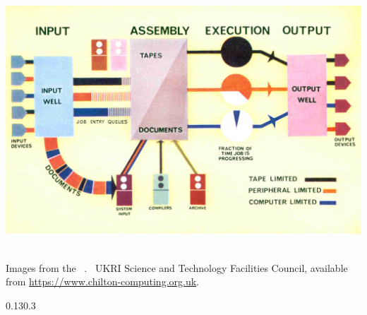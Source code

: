 \documentclass[aspectratio=169,mathserif,notheorems]{beamer}%
\begin{document}
\begin{frame}[t]
{{{{{\includegraphics[width=\linewidth,trim={0 10px 0 10px},clip]{graphics/atlas2}%
}%
}\strut\\[3pt]%
\tiny{Images from the ~\cite{M2025CC:FCSA1B1}. %
\textcopyright~UKRI Science and Technology Facilities Council, available from \url{https://www.chilton-computing.org.uk}.}%
}}%
}{0.13}{0.3}%
%
\end{frame}%
%
\end{document}
